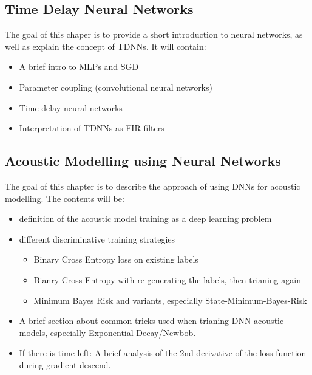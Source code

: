 \subsection{Time Delay Neural Networks}
\label{ch:TDNN}
The goal of this chaper is to provide a short introduction to neural networks, 
as well as explain the concept of TDNNs. It will contain:
\begin{itemize}
	\item A brief intro to MLPs and SGD
	\item Parameter coupling (convolutional neural networks)
	\item Time delay neural networks
	\item Interpretation of TDNNs as FIR filters
\end{itemize}

\subsection{Acoustic Modelling using Neural Networks}
\label{ch:acoustic_modelling}
The goal of this chapter is to describe the approach of using DNNs for acoustic modelling.
The contents will be: 
\begin{itemize}
	\item definition of the acoustic model training as a deep learning problem
	\item different discriminative training strategies
	\begin{itemize}
		\item Binary Cross Entropy loss on existing labels
		\item Bianry Cross Entropy with re-generating the labels, then trianing again
		\item Minimum Bayes Risk and variants, especially State-Minimum-Bayes-Risk
	\end{itemize}
	\item A brief section about common tricks used when trianing DNN acoustic models, 
	especially Exponential Decay/Newbob.
	\item If there is time left: A brief analysis of the 2nd derivative of the loss function
	during gradient descend.
\end{itemize}

